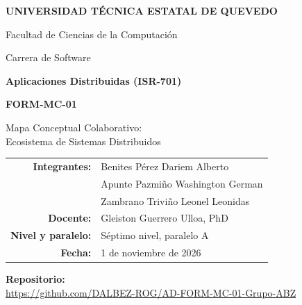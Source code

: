 \documentclass[12pt,a4paper]{article}
\newcommand{\repourl}{https://github.com/DALBEZ-ROG/AD-FORM-MC-01-Grupo-ABZ}
\newcommand{\fecha}{1 de noviembre de 2026}
\begin{document}
\begin{center}
  {\Large\bfseries UNIVERSIDAD TÉCNICA ESTATAL DE QUEVEDO\par}
  \vspace{4pt}
  {\large Facultad de Ciencias de la Computación\par}
  {\large Carrera de Software\par}
  \vspace{1.6cm}
  {\large\bfseries Aplicaciones Distribuidas (ISR-701)\par}
  \vspace{0.8cm}
  {\Large\bfseries FORM-MC-01\par}
  \vspace{4pt}
  {\large Mapa Conceptual Colaborativo:\\ Ecosistema de Sistemas Distribuidos\par}
\end{center}

\vspace{1.6cm}
\begin{center}
\renewcommand{\arraystretch}{1.5}
\begin{tabular}{>{\bfseries}r l}
  Integrantes: & Benites Pérez Dariem Alberto \\
               & Apunte Pazmiño Washington German \\
               & Zambrano Triviño Leonel Leonidas \\
  Docente:     & Gleiston Guerrero Ulloa, PhD \\
  Nivel y paralelo: & Séptimo nivel, paralelo A \\
  Fecha:       & \fecha \\
\end{tabular}
\end{center}

\vfill
\begin{center}
  {\bfseries Repositorio:}\\[4pt]
  {\small\url{\repourl}}
\end{center}
\vspace{1cm}
\end{document}

